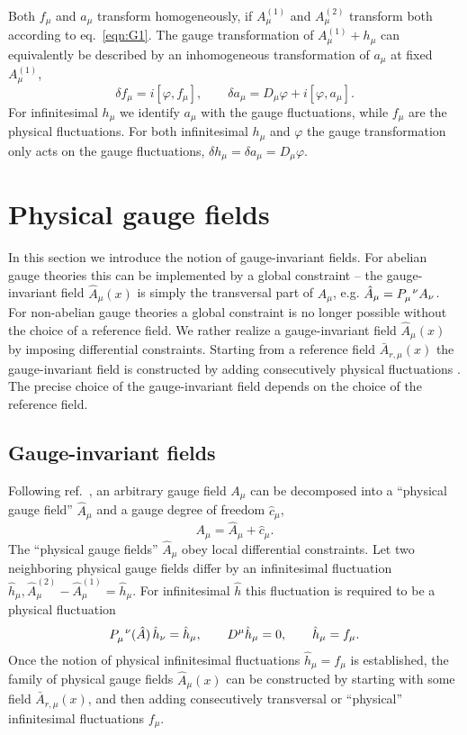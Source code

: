 \documentclass[twocolumn,aps,prd,amsmath,amssymb,preprintnumbers,longbibliography]{revtex4-1}
\numberwithin{equation}{section}
\begin{document}
Both $f_\mu$ and $a_\mu$ transform homogeneously, if $A^{(1)}_\mu$ and $A^{(2)}_\mu$ transform both according to eq.~\eqref{eqn:G1}. The gauge transformation of $A_\mu^{(1)} + h_\mu$ can equivalently be described by an inhomogeneous transformation of $a_\mu$ at fixed $A_\mu^{(1)}$,
\begin{equation}\label{eqn:J10}
	\delta f_\mu
	= i [\varphi,f_\mu],
	\qquad
	\delta a_\mu
	= D_\mu \varphi + i [\varphi,a_\mu].
\end{equation}
For infinitesimal $h_\mu$ we identify $a_\mu$ with the gauge fluctuations, while $f_\mu$ are the physical fluctuations. For both infinitesimal $h_\mu$ and $\varphi$ the gauge transformation only acts on the gauge fluctuations, $\delta h_\mu = \delta a_\mu = D_\mu \varphi$.



\section{Physical gauge fields}
\label{sec:physical gauge fields}

In this section we introduce the notion of gauge-invariant fields. For abelian gauge theories this can be implemented by a global constraint -- the gauge-invariant field $\hat{A}_\mu(x)$ is simply the transversal part of $A_\mu$, e.g. $\hat{A}_\mu = \tensor{P}{_\mu^\nu} A_\nu$. For non-abelian gauge theories a global constraint is no longer possible without the choice of a reference field. We rather realize a gauge-invariant field $\hat{A}_\mu(x)$ by imposing differential constraints. Starting from a reference field $\bar{A}_{r,\mu}(x)$ the gauge-invariant field is constructed by adding consecutively physical fluctuations \cite{CWGD}. The precise choice of the gauge-invariant field depends on the choice of the reference field.


\subsection{Gauge-invariant fields}

Following ref.~\cite{CWGD}, an arbitrary gauge field $A_\mu$ can be decomposed into a ``physical gauge field'' $\hat{A}_\mu$ and a gauge degree of freedom $\hat{c}_\mu$,
\begin{equation}\label{eqn:274A}
	A_\mu
	= \hat{A}_\mu + \hat{c}_\mu.
\end{equation}
The ``physical gauge fields'' $\hat{A}_\mu$ obey local differential constraints. Let two neighboring physical gauge fields differ by an infinitesimal fluctuation $\hat{h}_\mu,\hat{A}_\mu^{(2)} - \hat{A}^{(1)}_\mu = \hat{h}_\mu$. For infinitesimal $\hat{h}$ this fluctuation is required to be a physical fluctuation
\begin{equation}\label{eqn:G11C}
	\tensor{P}{_\mu^\nu}(\hat{A}) \, \hat{h}_\nu
	= \hat{h}_\mu,
	\qquad
	D^\mu \hat{h}_\mu
	= 0,
	\qquad
	\hat{h}_\mu
	= f_\mu.
\end{equation}
Once the notion of physical infinitesimal fluctuations $\hat{h}_\mu = f_\mu$ is established, the family of physical gauge fields $\hat{A}_\mu(x)$ can be constructed by starting with some field $\bar{A}_{r,\mu}(x)$, and then adding consecutively transversal or ``physical'' infinitesimal fluctuations $f_\mu$.
\end{document}
